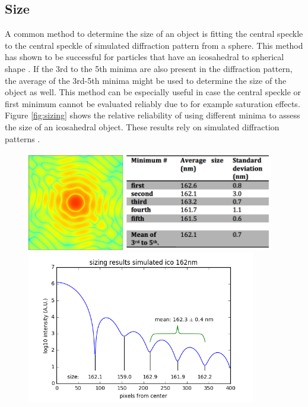\subsection{Size}
A common method to determine the size of an object is fitting the central speckle to the central speckle of simulated diffraction pattern from a sphere. This method has shown to be successful for particles that have an icosahedral to spherical shape \cite{Hantke2014,Daurer2017}. If the 3rd to the 5th minima are also present in the diffraction pattern, the average of the 3rd-5th minima might be used to determine the size of the object as well. This method can be especially useful in case the central speckle or first minimum cannot be evaluated reliably due to for example saturation effects. Figure \ref{fig:sizing} shows the relative reliability of using different minima to assess the size of an icosahedral object. These results rely on simulated diffraction patterns \cite{Hantke2016}.

\begin{figure}[h]
\centering
\includegraphics[width=42mm]{Chapter_08_ImageClassification_Simulated_Icosahedron.png}
\includegraphics[width=65mm]{Chapter_08_ImageClassification_Stats.png}
\includegraphics[width=100mm]{Chapter_08_ImageClassification_Sizing_Results.png}

\caption{}\label{fig:shape_assessment}
\end{figure}


